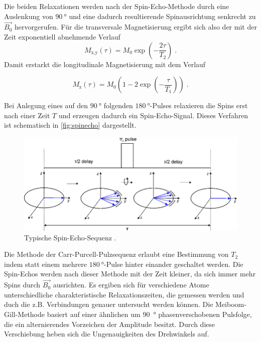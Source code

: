 Die beiden Relaxationen werden nach der Spin-Echo-Methode durch eine Auslenkung von $\SI{90}{\degree}$
und eine dadurch resultierende Spinausrichtung senkrecht zu $\vec{B_0}$ hervorgerufen.
Für die transversale Magnetisierung ergibt sich also der mit der Zeit exponentiell abnehmende Verlauf
\begin{equation}
    M_\text{x,y} \left(\tau\right) = M_0 \exp{\left(-\frac{2\tau}{T_2}\right)} \; .
    \label{eqn:MGM}
\end{equation}
Damit erstarkt die longitudinale Magnetisierung mit dem Verlauf 

\begin{equation}
    M_\text{z}\left(\tau\right) = M_0 \left(1-2\exp{\left(-\frac{\tau}{T_1}\right)}\right) \; .
    \label{eqn:SGR}
\end{equation}

Bei Anlegung eines auf den $\SI{90}{\degree}$ folgenden $\SI{180}{\degree}$-Pulses relaxieren die Spins erst nach einer Zeit $T$
und erzeugen dadurch ein Spin-Echo-Signal. Dieses Verfahren ist schematisch in \ref{fig:spinecho} dargestellt.

\begin{figure}
    \centering
    \includegraphics[scale=0.4]{content/spinecho.png}
    \caption{Typische Spin-Echo-Sequenz \cite{spinecho}.}
    \label{fig:mgm}
  \end{figure}

  Die Methode der Carr-Purcell-Pulzsequenz erlaubt eine Bestimmung von $T_2$ indem statt einem mehrere
  $\SI{180}{\degree}$-Pulse hinter einander geschaltet werden. Die Spin-Echos werden nach dieser
  Methode mit der Zeit kleiner, da sich immer mehr Spins durch $\vec{B_0}$ ausrichten.
  Es ergiben sich für verschiedene Atome unterschiedliche charakteristische Relaxationszeiten, 
  die gemessen werden und duch die z.B. Verbindungen genauer untersucht werden können.
  Die Meiboom-Gill-Methode basiert auf einer ähnlichen um \SI{90}{\degree} phasenverschobenen Pulsfolge, 
  die ein alternierendes Vorzeichen der Amplitude besitzt. Durch diese Verschiebung heben sich die 
  Ungenauigkeiten des Drehwinkels auf.

